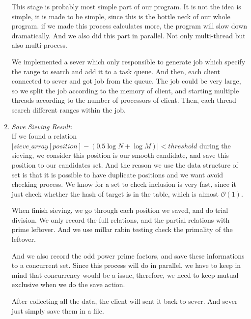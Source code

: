 \documentclass[12pt]{article} %
\newcommand{\itemgap}[1][2]{\vspace{#1mm}}
\begin{document}
\begin{enumerate}
		This stage is probably most simple part of our program. It is not the idea is simple, it is made to be simple, since this is the bottle neck of our whole program. if we made this process calculates more, the program will slow down dramatically. And we also did this part in parallel. Not only multi-thread but also multi-process. 
		
		We implemented a sever which only responsible to generate job which specify the range to search and add it to a task queue. And then, each client connected to sever and got job from the queue. The job could be very large, so we split the job according to the memory of client, and starting multiple threads according to the number of processors of client. Then, each thread search different ranges within the job.
		
		\item \textit{Save Sieving Result:} \itemgap
		\\ If we found a relation $\left|sieve\_array[position]-(0.5\log{N}+\log{M})\right| < threshold$ during the sieving, we consider this position is our smooth candidate, and save this position to our candidates set. And the reason we use the data structure of set is that it is possible to have duplicate positions and we want avoid checking process. We know for a set to check inclusion is very fast, since it just check whether the hash of target is in the table, which is almost $\mathcal{O}(1)$. 
		
		When finish sieving, we go through each position we saved, and do trial division. We  only record the full relations, and the partial relations with prime leftover. And we use millar rabin testing check the primality of the leftover. 
		
		And we also record the odd power prime factors, and save these informations to a concurrent set. Since this process will do in parallel, we have to keep in mind that concurrency would be a issue, therefore, we need to keep mutual exclusive when we do the save action. 
		
		After collecting all the data, the client will sent it back to sever. And sever just simply save them in a file.
		

\end{enumerate}
\end{document}
